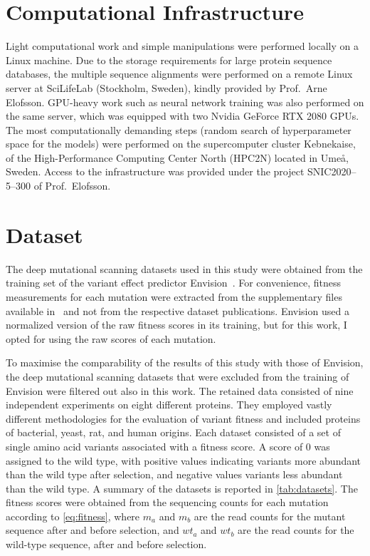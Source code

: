 \section{Computational Infrastructure}
Light computational work and simple manipulations were performed locally on a Linux machine.
Due to the storage requirements for large protein sequence databases, the multiple sequence alignments were performed on a remote Linux server at SciLifeLab (Stockholm, Sweden), kindly provided by Prof.~Arne Elofsson.
GPU-heavy work such as neural network training was also performed on the same server, which was equipped with two Nvidia GeForce RTX 2080 GPUs.
The most computationally demanding steps (random search of hyperparameter space for the models) were performed on the supercomputer cluster Kebnekaise, of the High-Performance Computing Center North (HPC2N) located in Umeå, Sweden.
Access to the infrastructure was provided under the project SNIC2020--5--300 of Prof.~Elofsson.

\section{Dataset}\label{sec:mm_dataset}
The deep mutational scanning datasets used in this study were obtained from the training set of the variant effect predictor Envision~\parencite{Gray2018}.
For convenience, fitness measurements for each mutation were extracted from the supplementary files available in~\cite{Gray2018} and not from the respective dataset publications.
Envision used a normalized version of the raw fitness scores in its training, but for this work, I opted for using the raw scores of each mutation.

To maximise the comparability of the results of this study with those of Envision, the deep mutational scanning datasets that were excluded from the training of Envision were filtered out also in this work.
The retained data consisted of nine independent experiments on eight different proteins.
They employed vastly different methodologies for the evaluation of variant fitness and included proteins of bacterial, yeast, rat, and human origins.
Each dataset consisted of a set of single amino acid variants associated with a fitness score.
A score of \num{0} was assigned to the wild type, with positive values indicating variants more abundant than the wild type after selection, and negative values variants less abundant than the wild type.
A summary of the datasets is reported in \cref{tab:datasets}.
The fitness scores were obtained from the sequencing counts for each mutation according to \cref{eq:fitness}, where $m_a$ and $m_b$ are the read counts for the mutant sequence after and before selection, and  $wt_a$ and $wt_b$ are the read counts for the wild-type sequence, after and before selection.

